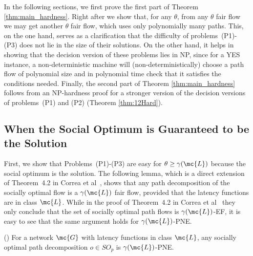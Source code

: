 In the following sections, we first prove the first part of Theorem \ref{thm:main_hardness}. Right after we show that, for any $\theta$, from any $\theta$ fair flow we may get another $\theta$ fair flow, which uses only polynomially many paths. This, on the one hand, serves as a clarification that the difficulty of problems~(P1)-(P3) does not lie in the size of their solutions. On the other hand, it helps in showing that the decision version of these problems lies in NP, since for a YES instance, a non-deterministic machine will (non-deterministically) choose a path flow of polynomial size and in polynomial time check that it satisfies the conditions needed. Finally, the second part of Theorem \ref{thm:main_hardness} follows from an NP-hardness proof for a stronger version of the decision versions of problems~(P1) and (P2) (Theorem \ref{thm:12Hard}).


\subsection{When the Social Optimum is Guaranteed to be the Solution}\label{sec:complexity_so}
First, we show that Problems~(P1)-(P3) are easy for $\theta \ge \gamma(\mc{L})$ because the social optimum is the solution.
The following lemma, which is a direct extension of Theorem~4.2 in Correa et al~\cite{correa2007fast}, shows that any path decomposition of the socially optimal flow is a $\gamma(\mc{L})$ fair flow, provided that the latency functions are in class $\mc{L}$.  While in the proof of Theorem~4.2 in Correa et al~\cite{correa2007fast} they only conclude that the set of socially optimal path flows is $\gamma(\mc{L})$-EF, it is easy to see that the same argument holds for $\gamma(\mc{L})$-PNE.
\begin{lemma}(\cite{correa2007fast})
For a network $\mc{G}$ with latency functions  in class $\mc{L}$, any socially optimal path decomposition $o \in SO_p$ is $\gamma(\mc{L})$-PNE.
\end{lemma}
 
